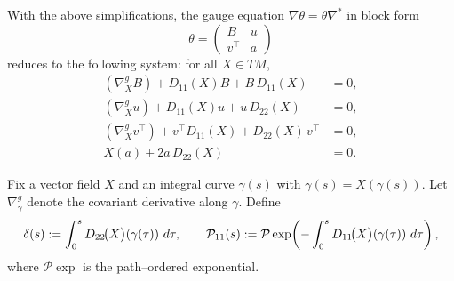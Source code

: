 With the above simplifications, the gauge equation $\nabla \theta = \theta \nabla^\ast$ in block form
\[
\theta =
\begin{pmatrix}
B & u\\
v^{\top} & a
\end{pmatrix}
\]
reduces to the following system: for all $X \in TM$,
\begin{align}
(\nabla^g_X B) + D_{11}(X) B + B\,D_{11}(X) &= 0, \tag{1a'}\\
(\nabla^g_X u) + D_{11}(X) u + u\,D_{22}(X) &= 0, \tag{1b'}\\
(\nabla^g_X v^{\top}) + v^{\top} D_{11}(X) + D_{22}(X)\,v^{\top} &= 0, \tag{1c'}\\
X(a) + 2 a\, D_{22}(X) &= 0. \tag{1d'}
\end{align}


Fix a vector field $X$ and an integral curve $\gamma(s)$ with $\dot{\gamma}(s) = X(\gamma(s))$. 
Let $\nabla^g_{\dot{\gamma}}$ denote the covariant derivative along $\gamma$. 
Define
\begin{equation}
\notag
\delta(s) := \int_{0}^{s} D_{22}\!\big(X\big)\!\left(\gamma(\tau)\right)\,d\tau,
\qquad
\mathcal{P}_{11}(s) := \mathcal{P}\exp\!\left(-\int_{0}^{s} D_{11}\!\big(X\big)\!\left(\gamma(\tau)\right)\,d\tau\right),
\end{equation}
where $\mathcal{P}\exp$ is the path--ordered exponential.

